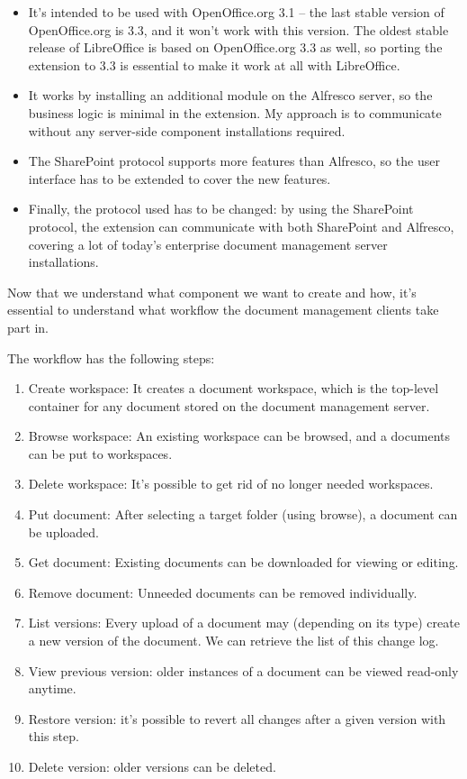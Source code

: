 \begin{itemize}
\item It's intended to be used with OpenOffice.org 3.1 -- the last stable
version of OpenOffice.org is 3.3, and it won't work with this version. The
oldest stable release of LibreOffice is based on OpenOffice.org 3.3 as well, so
porting the extension to 3.3 is essential to make it work at all with
LibreOffice.
\item It works by installing an additional module on the Alfresco server, so
the business logic is minimal in the extension. My approach is to communicate
without any server-side component installations required.
\item The SharePoint protocol supports more features than Alfresco, so the user 
interface has to be extended to cover the new features.
\item Finally, the protocol used has to be changed: by using the SharePoint
protocol, the extension can communicate with both SharePoint and Alfresco,
covering a lot of today's enterprise document management server
installations.
\end{itemize}

Now that we understand what component we want to create and how, it's
essential to understand what workflow the document management clients take part
in.

The workflow has the following steps:

\begin{enumerate}
\item Create workspace: It creates a document workspace, which is the top-level
container for any document stored on the document management server.
\item Browse workspace: An existing workspace can be browsed, and a documents
can be put to workspaces.
\item Delete workspace: It's possible to get rid of no longer needed workspaces.
\item Put document: After selecting a target folder (using browse), a document
can be uploaded.
\item Get document: Existing documents can be downloaded for viewing or editing.
\item Remove document: Unneeded documents can be removed individually.
\item List versions: Every upload of a document may (depending on its type)
create a new version of the document. We can retrieve the list of this change log.
\item View previous version: older instances of a document can be viewed
read-only anytime.
\item Restore version: it's possible to revert all changes after a given
version with this step.
\item Delete version: older versions can be deleted.
\end{enumerate}


